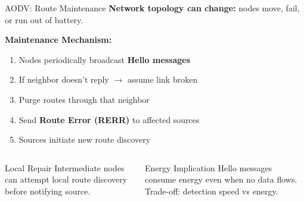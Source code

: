 \documentclass[aspectratio=169,11pt]{beamer}
\begin{document}
\begin{frame}{AODV: Route Maintenance}
    \textbf{Network topology can change:} nodes move, fail, or run out of battery.
    
    \vspace{0.3cm}
    \textbf{Maintenance Mechanism:}
    \begin{enumerate}
        \item Nodes periodically broadcast \textbf{Hello messages}
        \item If neighbor doesn't reply $\rightarrow$ assume link broken
        \item Purge routes through that neighbor
        \item Send \textbf{Route Error (RERR)} to affected sources
        \item Sources initiate new route discovery
    \end{enumerate}
    
    \vspace{0.3cm}
    \begin{columns}
        \begin{exampleblock}{Local Repair}
            Intermediate nodes can attempt local route discovery before notifying source.
        \end{exampleblock}
        
        \begin{alertblock}{Energy Implication}
            Hello messages consume energy even when no data flows. Trade-off: detection speed vs energy.
        \end{alertblock}
    \end{columns}
\end{frame}
\end{document}
